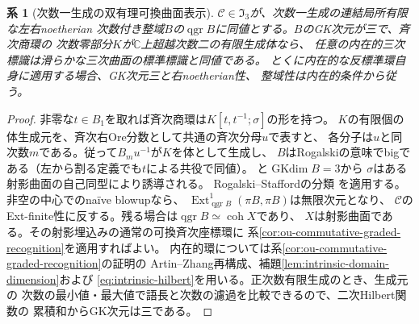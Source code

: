 \documentclass[11pt,a4paper]{ltjsarticle}
\newtheorem{corollary}[theorem]{系}
\theoremstyle{definition}
\newcommand{\qgr}{\operatorname{qgr}}
\newcommand{\coh}{\operatorname{coh}}
\begin{document}
\begin{corollary}[次数一生成の双有理可換曲面表示]
\label{cor:ou-birationally-commutative-degree-one}
$\mathcal C\in\mathfrak I_3$が、次数一生成の連結局所有限な左右noetherian
次数付き整域$B$の$\qgr B$に同値とする。$B$のGK次元が三で、斉次商環の
次数零部分$K$が$\mathbb C$上超越次数二の有限生成体なら、
任意の内在的三次標識は滑らかな三次曲面の標準標識と同値である。
とくに内在的な反標準環自身に適用する場合、GK次元三と右noetherian性、
整域性は内在的条件から従う。
\end{corollary}
\begin{proof}
非零な$t\in B_1$を取れば斉次商環は$K[t,t^{-1};\sigma]$の形を持つ。
$K$の有限個の体生成元を、斉次右Ore分数として共通の斉次分母$u$で表すと、
各分子は$u$と同次数$m$である。従って$B_m u^{-1}$が$K$を体として生成し、
$B$はRogalskiの意味でbigである（左から割る定義でも$t$による共役で同値）。
\cite[Theorem~1.1]{RogalskiGK2009}と$\operatorname{GKdim}B=3$から
$\sigma$はある射影曲面の自己同型により誘導される。
Rogalski--Staffordの分類\cite[Theorem~1.1, Corollary~1.3]{RogalskiStafford2009}
を適用する。非空の中心でのnaïve blowupなら、
$\operatorname{Ext}^1_{\qgr B}(\pi B,\pi B)$は無限次元となり、
$\mathcal C$のExt-finite性に反する。残る場合は$\qgr B\simeq\coh X$であり、
$X$は射影曲面である。その射影埋込みの通常の可換斉次座標環に
系\ref{cor:ou-commutative-graded-recognition}を適用すればよい。
内在的環については系\ref{cor:ou-commutative-graded-recognition}の証明の
Artin--Zhang再構成、補題\ref{lem:intrinsic-domain-dimension}および
\eqref{eq:intrinsic-hilbert}を用いる。正次数有限生成のとき、生成元の
次数の最小値・最大値で語長と次数の濾過を比較できるので、二次Hilbert関数の
累積和からGK次元は三である。
\end{proof}
\end{document}

